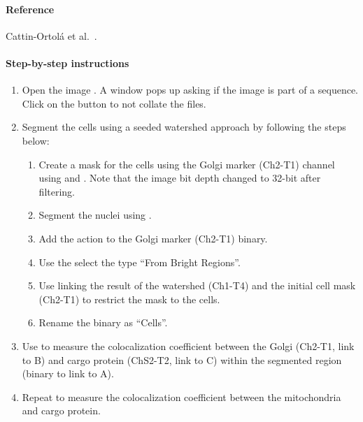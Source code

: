 \paragraph{Reference} Cattin-Ortol{\'a} et al.~\cite{cattinortola2024}.

\paragraph{Step-by-step instructions}
\begin{enumerate}
    \item Open the image . A window pops up asking if the image is part of a sequence. Click on the  button to not collate the files.
    \item Segment the cells using a seeded watershed approach by following the steps below:
    \begin{enumerate}
        \item Create a mask for the cells using the Golgi marker (Ch2-T1) channel using  and 
        . 
        Note that the image bit depth changed to 32-bit after filtering.
        \item Segment the nuclei using 
        .
        \item Add the action  to the Golgi marker (Ch2-T1) binary. 
        \item Use the  select the type ``From Bright Regions''. 
        \item Use  linking the result of the watershed (Ch1-T4) and the initial cell mask (Ch2-T1) to restrict the mask to the cells.
        \item Rename the binary as ``Cells''.
    \end{enumerate}
    \item Use  to measure the colocalization coefficient between the Golgi (Ch2-T1, link to B) and cargo protein (ChS2-T2, link to C) within the segmented region (binary to link to A). 
    \item Repeat to measure the colocalization coefficient between the mitochondria and cargo protein.

\end{enumerate}
